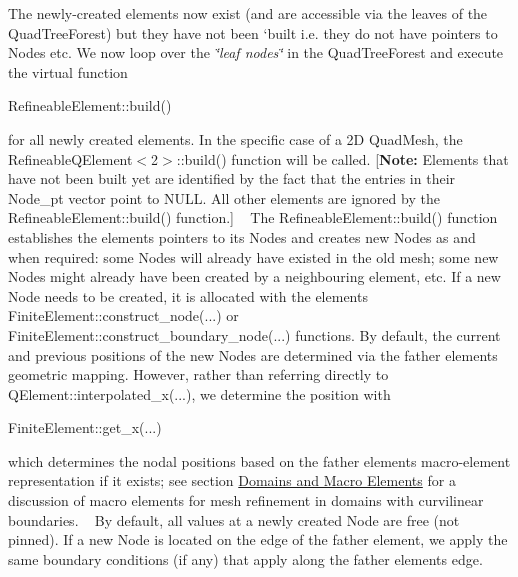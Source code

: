 \begin{DoxyItemize}
\begin{DoxyItemize}
\end{DoxyItemize}
\item The newly-\/created elements now exist (and are accessible via the leaves of the {\ttfamily Quad\+Tree\+Forest}) but they have not been `built\textquotesingle{} i.\+e. they do not have pointers to {\ttfamily Nodes} etc. We now loop over the {\itshape \char`\"{}leaf nodes\char`\"{}} in the {\ttfamily Quad\+Tree\+Forest} and execute the virtual function 
\begin{DoxyCode}
RefineableElement::build() 
\end{DoxyCode}
 for all newly created elements. In the specific case of a 2D {\ttfamily Quad\+Mesh}, the {\ttfamily Refineable\+Q\+Element$<$2$>$\+::build()} function will be called. \mbox{[}{\bfseries Note\+:} Elements that have not been built yet are identified by the fact that the entries in their {\ttfamily Node\+\_\+pt} vector point to N\+U\+LL. All other elements are ignored by the {\ttfamily Refineable\+Element\+::build()} function.\mbox{]} ~\newline
 The {\ttfamily Refineable\+Element\+::build()} function establishes the element\textquotesingle{}s pointers to its {\ttfamily Nodes} and creates new {\ttfamily Nodes} as and when required\+: some {\ttfamily Nodes} will already have existed in the old mesh; some new {\ttfamily Nodes} might already have been created by a neighbouring element, etc. If a new {\ttfamily Node} needs to be created, it is allocated with the element\textquotesingle{}s {\ttfamily Finite\+Element\+::construct\+\_\+node}(...) or {\ttfamily Finite\+Element\+::construct\+\_\+boundary\+\_\+node}(...) functions. By default, the current and previous positions of the new {\ttfamily Nodes} are determined via the father element\textquotesingle{}s geometric mapping. However, rather than referring directly to {\ttfamily Q\+Element\+::interpolated\+\_\+x}(...), we determine the position with 
\begin{DoxyCode}
FiniteElement::get\_x(...) 
\end{DoxyCode}
 which determines the nodal positions based on the father element\textquotesingle{}s macro-\/element representation if it exists; see section \hyperlink{index_MacroElements}{Domains and Macro Elements} for a discussion of macro elements for mesh refinement in domains with curvilinear boundaries. ~\newline
 By default, all values at a newly created {\ttfamily Node} are free (not pinned). If a new {\ttfamily Node} is located on the edge of the father element, we apply the same boundary conditions (if any) that apply along the father element\textquotesingle{}s edge. ~\newline

\end{DoxyItemize}
